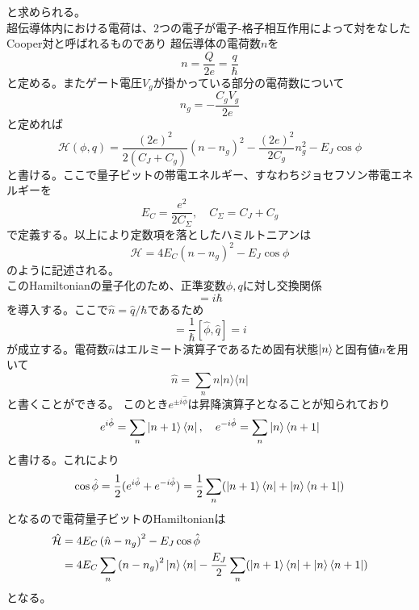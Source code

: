         と求められる。\\
        超伝導体内における電荷は、2つの電子が電子-格子相互作用によって対をなしたCooper対と呼ばれるものであり
        超伝導体の電荷数$n$を
        \begin{equation}n=\frac{Q}{2 e}=\frac{q}{\hbar}\end{equation}
        と定める。またゲート電圧$V_g$が掛かっている部分の電荷数について
        \begin{equation}n_{g}=-\frac{C_{g} V_{g}}{2 e}\end{equation}
        と定めれば
        \begin{equation}\mathcal{H}(\phi, q)=\frac{(2 e)^{2}}{2\left(C_{J}+C_{g}\right)}\left(n-n_{g}\right)^{2}-\frac{(2 e)^{2}}{2 C_{g}} n_g^{2}-E_{J} \cos \phi\end{equation}
        と書ける。ここで量子ビットの帯電エネルギー、すなわちジョセフソン帯電エネルギーを
        \begin{equation}E_{C}=\frac{e^{2}}{2 C_{\Sigma}}, \quad C_{\Sigma}=C_{J}+C_{g}\end{equation}
        で定義する。以上により定数項を落としたハミルトニアンは
        \begin{equation}\mathcal{H}=4 E_{C}\left(n-n_{g}\right)^{2}-E_{J} \cos \phi\end{equation}
        のように記述される。\\
        このHamiltonianの量子化のため、正準変数$\phi,q$に対し交換関係
        \begin{equation}[\hat{\phi}, \hat{q}]=i \hbar\end{equation}
        を導入する。ここで$\hat{n}=\hat{q} / \hbar$であるため
        \begin{equation}[\hat{\phi}, \hat{n}]=\frac{1}{\hbar}[\hat{\phi}, \hat{q}]=i\end{equation}
        が成立する。電荷数$\hat{n}$はエルミート演算子であるため固有状態$\ket{n}$と固有値$n$を用いて
        \begin{equation}\hat{n}=\sum_{n} n|n\rangle\langle n|\end{equation}
        と書くことができる。
        このとき$e^{\pm i \hat{\phi}}$は昇降演算子となることが知られており
        \begin{equation}e^{i \hat{\phi}}=\sum_{n}\ket{n+1}\bra{n}, \quad e^{-i \hat{\phi}}=\sum_{n}\ket{n}\bra{n+1}\end{equation}
        と書ける。これにより
        \begin{equation}
            \cos \hat{\phi} = \frac{1}{2}(e^{i \hat{\phi}}+e^{-i \hat{\phi}})=\frac{1}{2}\sum_{n}(\ket{n+1}\bra{n}+\ket{n}\bra{n+1})
        \end{equation}
        となるので電荷量子ビットのHamiltonianは
        \begin{equation}\begin{aligned}
            \hat{\mathcal{H}} &=4 E_{C}\left(\hat{n}-n_{g}\right)^{2}-E_{J} \cos \hat{\phi} \\
            &=4 E_{C} \sum_{n}\left(n-n_{g}\right)^{2}\ket{n}\bra{n}-\frac{E_{J}}{2} \sum_{n}(\ket{n+1}\bra{n}+\ket{n}\bra{n+1})
            \end{aligned}\end{equation}
        となる。
